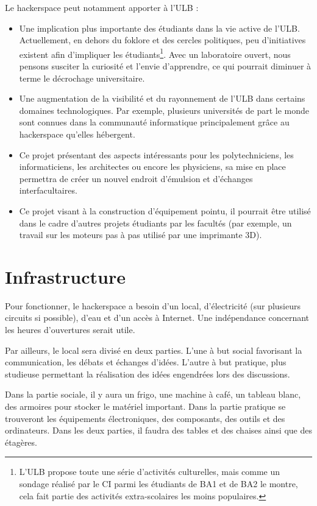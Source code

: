 \documentclass{article}
\begin{document}
Le hackerspace peut notamment apporter à l'ULB : 
\begin{itemize}
\item Une implication plus importante des étudiants dans la vie active de l'ULB.
Actuellement, en dehors du foklore et des cercles politiques, peu d'initiatives existent afin d'impliquer les étudiants\footnote{L'ULB propose toute une série d'activités culturelles, mais comme un sondage réalisé par le CI parmi les étudiants de BA1 et de BA2 le montre, cela fait partie des activités extra-scolaires les moins populaires.}.
Avec un laboratoire ouvert, nous pensons susciter la curiosité et l'envie d'apprendre, ce qui pourrait diminuer à terme le décrochage universitaire.
\item Une augmentation de la visibilité et du rayonnement de l'ULB dans certains domaines technologiques.
Par exemple, plusieurs universités de part le monde sont connues dans la communauté informatique
principalement grâce au hackerspace qu'elles hébergent.
\item Ce projet présentant des aspects intéressants pour les polytechniciens, les informaticiens,
les architectes ou encore les physiciens, sa mise en place permettra de créer un nouvel endroit d'émulsion
et d'échanges interfacultaires.
\item Ce projet visant à la construction d'équipement pointu, il pourrait être utilisé dans le cadre d'autres projets étudiants par les facultés (par exemple, un travail sur les moteurs pas à pas utilisé par une imprimante 3D).
\end{itemize}

\section{Infrastructure}

Pour fonctionner, le hackerspace a besoin d'un local, d'électricité 
(sur plusieurs circuits si possible), d'eau et d'un accès à Internet. Une indépendance concernant les heures d'ouvertures serait utile.

Par ailleurs, le local sera divisé en deux parties. L'une à but social favorisant la communication, les débats et échanges d'idées. L'autre à but pratique, plus studieuse permettant la réalisation des idées engendrées lors des discussions. 

Dans la partie sociale, il y aura un frigo, une machine à café, un tableau blanc, 
des armoires pour stocker le matériel important.
\newline
Dans la partie pratique se trouveront les équipements électroniques, des composants, des outils et des ordinateurs.
\newline
Dans les deux parties, il faudra des tables et des chaises ainsi que des étagères.
\end{document}
